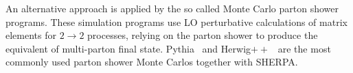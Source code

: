 An alternative approach is applied by the so called Monte Carlo parton shower programs. These simulation programs use LO perturbative calculations of matrix elements for $2 \rightarrow 2$ processes, relying on the parton shower to produce the equivalent of multi-parton final state.  {\sc Pythia}~\cite{PYTHIA6} and {\sc Herwig}$++$~\cite{HerwigPP} are the most commonly used parton shower Monte Carlos together with {\sc SHERPA}. %



